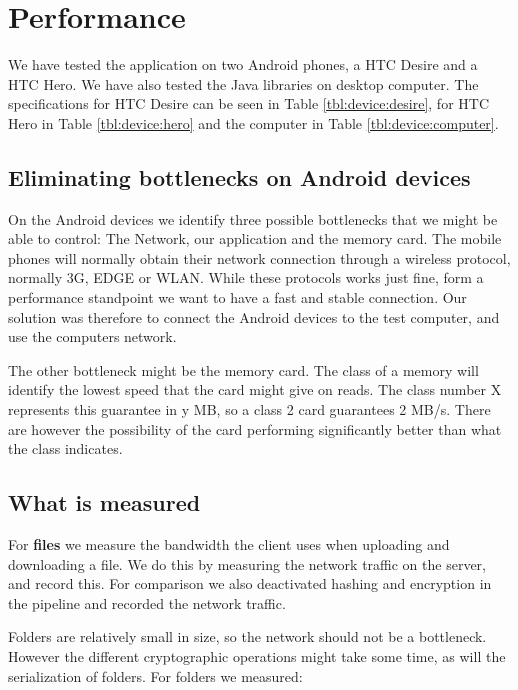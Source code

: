 \documentclass[pdftex,english,10pt,b5paper,twoside]{book}
\begin{document}
\section{Performance}
We have tested the application on two Android phones, a HTC Desire and a HTC
Hero. We have also tested the Java libraries on desktop computer. The
specifications for HTC Desire can be seen in Table \ref{tbl:device:desire},
for HTC Hero in Table \ref{tbl:device:hero} and the computer in Table
\ref{tbl:device:computer}.





\subsection{Eliminating bottlenecks on Android devices}
On the Android devices we identify three possible bottlenecks that we might be
able to control: The Network, our application and the memory card. The mobile
phones will normally obtain their network connection through a wireless
protocol, normally 3G, EDGE or WLAN. While these protocols works just fine,
form a performance standpoint we want to have a fast and stable connection. Our
solution was therefore to connect the Android devices to the test computer, and
use the computers network.

The other bottleneck might be the memory card. The class of a memory will
identify the lowest speed that the card might give on reads. The class number X
represents this guarantee in y MB, so a class 2 card guarantees 2 MB/s. There
are however the possibility of the card performing significantly better than
what the class indicates.

\subsection{What is measured}
For \textbf{files} we measure the bandwidth the client uses when uploading and
downloading a file. We do this by measuring the network traffic on the
server, and record this. For comparison we also deactivated hashing and
encryption in the pipeline and recorded the network traffic.

Folders are relatively small in size, so the network should not be a
bottleneck. However the different cryptographic operations might take some
time, as will the serialization of folders. For folders we measured:
\end{document}
